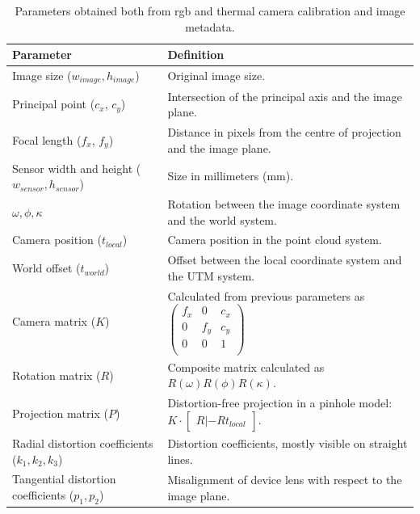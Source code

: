\renewcommand{\arraystretch}{1.3}
\begin{table}
    \sffamily\small
    \caption{Parameters obtained both from \acrshort{rgb} and thermal camera calibration and image metadata.}
    \label{table:thermal_pc_attributes}
    \begin{tabular}{@{}l@{\hskip 0.55in}l@{}}
    \toprule
    Parameter & Definition\\
    \midrule
    Image size ($w_{\textit{image}}, h_{\textit{image}}$) & Original image size.\\
    Principal point ($c_x$, $c_y$) & Intersection of the principal axis and the image plane. \\
    Focal length ($f_x$, $f_y$) & Distance in pixels from the centre of projection and the image plane. \\
    Sensor width and height ($w_{\textit{sensor}}, h_{\textit{sensor}}$) & Size in millimeters (\si{\milli\meter}). \\
    $\omega, \phi, \kappa$ & Rotation between the image coordinate system and the world system. \\
    Camera position ($t_{\textit{local}}$) & Camera position in the point cloud system.\\
    World offset ($t_{\textit{world}}$) & Offset between the local coordinate system and the UTM system.\\
    Camera matrix ($K$) & Calculated from previous parameters as $\begin{pmatrix} f_x & 0 & c_x\\ 0 & f_y & c_y\\ 0 & 0 & 1\\ \end{pmatrix}$ \\
    Rotation matrix ($R$) & Composite matrix calculated as $R(\omega)R(\phi)R(\kappa)$. \\
    Projection matrix ($P$) & Distortion-free projection in a pinhole model: $K \cdot \begin{bmatrix} R|-Rt_{\textit{local}} \end{bmatrix}$. \\
    Radial distortion coefficients ($k_1, k_2, k_3$) & Distortion coefficients, mostly visible on straight lines.\\
    Tangential distortion coefficients ($p_1, p_2$) & Misalignment of device lens with respect to the image plane. \\
    \bottomrule
    \end{tabular}
    \normalsize
\end{table}
\renewcommand{\arraystretch}{1}    

